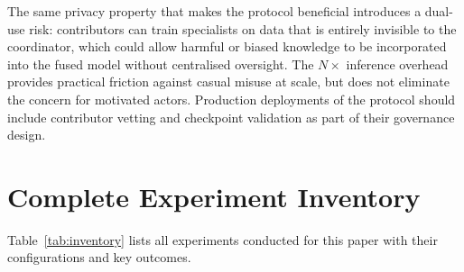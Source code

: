 \documentclass{article}
\begin{document}
The same privacy property that makes the protocol beneficial introduces a dual-use risk: contributors can train specialists on data that is entirely invisible to the coordinator, which could allow harmful or biased knowledge to be incorporated into the fused model without centralised oversight. The $N{\times}$ inference overhead provides practical friction against casual misuse at scale, but does not eliminate the concern for motivated actors. Production deployments of the protocol should include contributor vetting and checkpoint validation as part of their governance design.





\appendix

\section{Complete Experiment Inventory}
\label{app:inventory}

Table~\ref{tab:inventory} lists all experiments conducted for this paper with their configurations and key outcomes.
\end{document}
